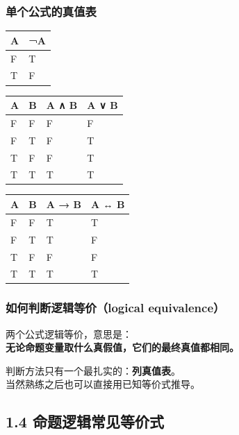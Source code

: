 \documentclass[
  11pt,
]{article}
\begin{document}
\subsubsection{单个公式的真值表}\label{ux5355ux4e2aux516cux5f0fux7684ux771fux503cux8868}

\begin{longtable}[]{@{}ll@{}}
\toprule\noalign{}
A & ¬A \\
\midrule\noalign{}
\endhead
\bottomrule\noalign{}
\endlastfoot
F & T \\
T & F \\
\end{longtable}

\begin{longtable}[]{@{}llll@{}}
\toprule\noalign{}
A & B & A ∧ B & A ∨ B \\
\midrule\noalign{}
\endhead
\bottomrule\noalign{}
\endlastfoot
F & F & F & F \\
F & T & F & T \\
T & F & F & T \\
T & T & T & T \\
\end{longtable}

\begin{longtable}[]{@{}llll@{}}
\toprule\noalign{}
A & B & A → B & A ↔ B \\
\midrule\noalign{}
\endhead
\bottomrule\noalign{}
\endlastfoot
F & F & T & T \\
F & T & T & F \\
T & F & F & F \\
T & T & T & T \\
\end{longtable}

\subsubsection{如何判断逻辑等价（logical
equivalence）}\label{ux5982ux4f55ux5224ux65adux903bux8f91ux7b49ux4ef7logical-equivalence}

两个公式逻辑等价，意思是：\\
\textbf{无论命题变量取什么真假值，它们的最终真值都相同。}

判断方法只有一个最扎实的：\textbf{列真值表}。\\
当然熟练之后也可以直接用已知等价式推导。

\subsection{1.4
命题逻辑常见等价式}\label{ux547dux9898ux903bux8f91ux5e38ux89c1ux7b49ux4ef7ux5f0f}
\end{document}
